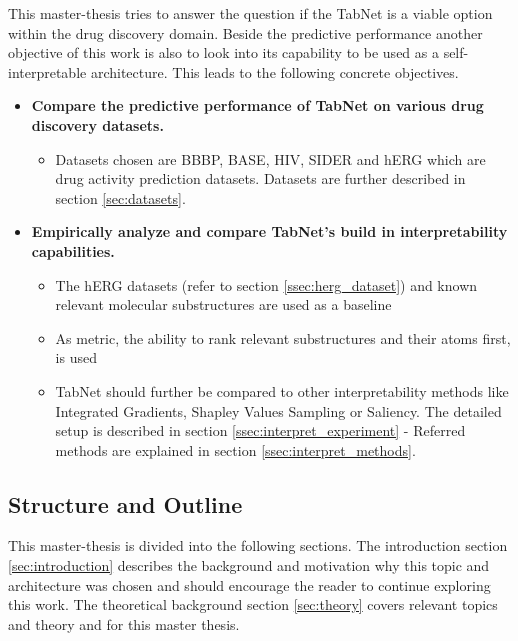 \documentclass[../main.tex]{subfiles}
\begin{document}
This master-thesis tries to answer the question if the TabNet is a viable option within the drug discovery domain. Beside the predictive performance another objective of this work is also to look into its capability to be used as a self-interpretable architecture. This leads to the following concrete objectives.

\begin{itemize}
  \item \textbf{Compare the predictive performance of TabNet on various drug discovery datasets.}
  \begin{itemize}
     \item Datasets chosen are BBBP, BASE, HIV, SIDER and hERG which are drug activity prediction datasets. Datasets are further described in section \ref{sec:datasets}.

  \end{itemize}
  \item \textbf{Empirically analyze and compare TabNet's build in interpretability capabilities. }
  \begin{itemize}
     \item The hERG datasets (refer to section \ref{ssec:herg_dataset}) and known relevant molecular substructures are used as a baseline
     \item As metric, the ability to rank relevant substructures and their atoms first, is used
     \item TabNet should further be compared to other interpretability methods like Integrated Gradients, Shapley Values Sampling or Saliency. The detailed setup is described in section \ref{ssec:interpret_experiment} - Referred methods are explained in section \ref{ssec:interpret_methods}.
    \end{itemize}
\end{itemize}

\subsection{Structure and Outline}

This master-thesis is divided into the following sections. 
The introduction section \ref{sec:introduction} describes the background and motivation why this topic and architecture was chosen and should encourage the reader to continue exploring this work.
The theoretical background section \ref{sec:theory} covers relevant topics and theory and for this master thesis. 
\end{document}
